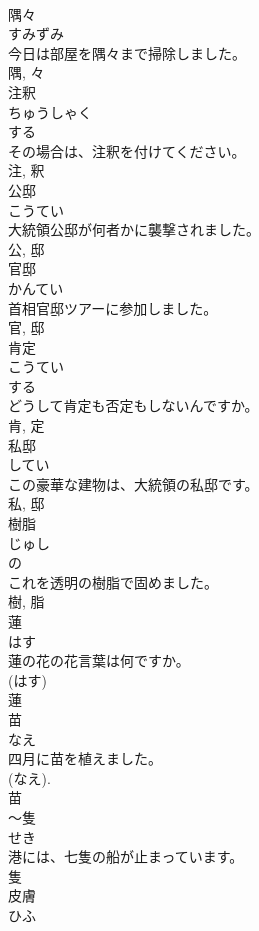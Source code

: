 \documentclass[8pt]{extreport}
\begin{document}
\begin{CJK}{UTF8}{min}
\\	隅々	
\\	すみずみ	
\\	今日は部屋を隅々まで掃除しました。	
\\	隅, 々	
\\	注釈	
\\	ちゅうしゃく	
\\	する 
\\	その場合は、注釈を付けてください。	
\\	注, 釈	
\\	公邸	
\\	こうてい	
\\	大統領公邸が何者かに襲撃されました。	
\\	公, 邸	
\\	官邸	
\\	かんてい	
\\	首相官邸ツアーに参加しました。	
\\	官, 邸	
\\	肯定	
\\	こうてい	
\\	する 
\\	どうして肯定も否定もしないんですか。	
\\	肯, 定	
\\	私邸	
\\	してい	
\\	この豪華な建物は、大統領の私邸です。	
\\	私, 邸	
\\	樹脂	
\\	じゅし	
\\	の 
\\	これを透明の樹脂で固めました。	
\\	樹, 脂	
\\	蓮	
\\	はす	
\\	蓮の花の花言葉は何ですか。	
\\	(はす) 
\\	蓮	
\\	苗	
\\	なえ	
\\	四月に苗を植えました。	
\\	(なえ). 
\\	苗	
\\	〜隻	
\\	せき	
\\	港には、七隻の船が止まっています。	
\\	隻	
\\	皮膚	
\\	ひふ	

\end{CJK}
\end{document}

